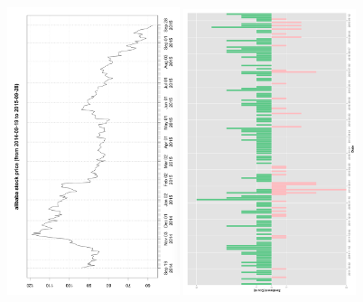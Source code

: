 \documentclass[11pt]{beamer}
\begin{document}
\begin{frame}
  \begin{figure}
    \includegraphics[width=0.45\textwidth]{plot/Alibaba-Stock-Price-R.png} \includegraphics[width=0.45\textwidth]{plot/Sen-Date.png}
  \end{figure}
\end{frame}
\end{document}

